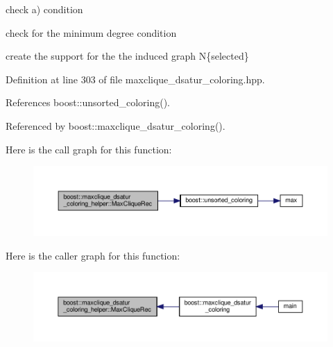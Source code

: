 check a) condition

check for the minimum degree condition

create the support for the the induced graph N\{selected\} 

Definition at line 303 of file maxclique\+\_\+dsatur\+\_\+coloring.\+hpp.



References boost\+::unsorted\+\_\+coloring().



Referenced by boost\+::maxclique\+\_\+dsatur\+\_\+coloring().

Here is the call graph for this function\+:
\nopagebreak
\begin{figure}[H]
\begin{center}
\leavevmode
\includegraphics[width=350pt]{d0/dd5/classboost_1_1maxclique__dsatur__coloring__helper_afd63b9cb7e6228c01fb266f19b7db9d3_cgraph}
\end{center}
\end{figure}
Here is the caller graph for this function\+:
\nopagebreak
\begin{figure}[H]
\begin{center}
\leavevmode
\includegraphics[width=350pt]{d0/dd5/classboost_1_1maxclique__dsatur__coloring__helper_afd63b9cb7e6228c01fb266f19b7db9d3_icgraph}
\end{center}
\end{figure}
\mbox{\label{classboost_1_1maxclique__dsatur__coloring__helper_a319cdb35be0d7121e295068c5c46f180}} 
